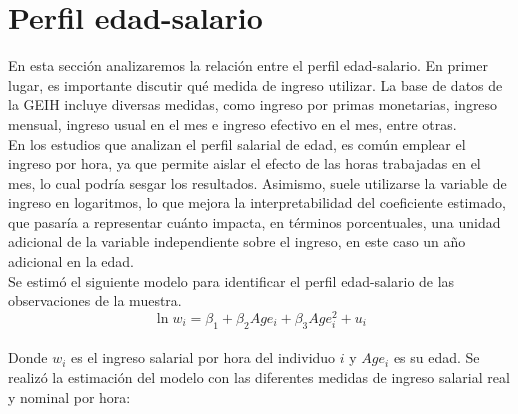 \documentclass[12pt,a4paper,onecolumn]{article}
\begin{document}
\section{Perfil edad-salario}
En esta sección analizaremos la relación entre el perfil edad-salario. En primer lugar, es importante discutir qué medida de ingreso utilizar. La base de datos de la GEIH incluye diversas medidas, como ingreso por primas monetarias, ingreso mensual, ingreso usual en el mes e ingreso efectivo en el mes, entre otras.\\ 

En los estudios que analizan el perfil salarial de edad, es común emplear el ingreso por hora, ya que permite aislar el efecto de las horas trabajadas en el mes, lo cual podría sesgar los resultados. 
Asimismo, suele utilizarse la variable de ingreso en logaritmos, lo que mejora la interpretabilidad del coeficiente estimado, que pasaría a representar cuánto impacta, en términos porcentuales, una unidad adicional de la variable independiente sobre el ingreso, en este caso un año adicional en la edad.\\

Se estimó el siguiente modelo para identificar el perfil edad-salario de las observaciones de la muestra.\\
\begin{equation}
    \ln{w_i}= \beta_1 + \beta_2 Age_i + \beta_3 Age_i^2 + u_i
\end{equation}\\
Donde $w_i$ es el ingreso salarial por hora del individuo $i$ y $Age_i$ es su edad. Se realizó la estimación del modelo con las diferentes medidas de ingreso salarial real y nominal por hora:
\end{document}
